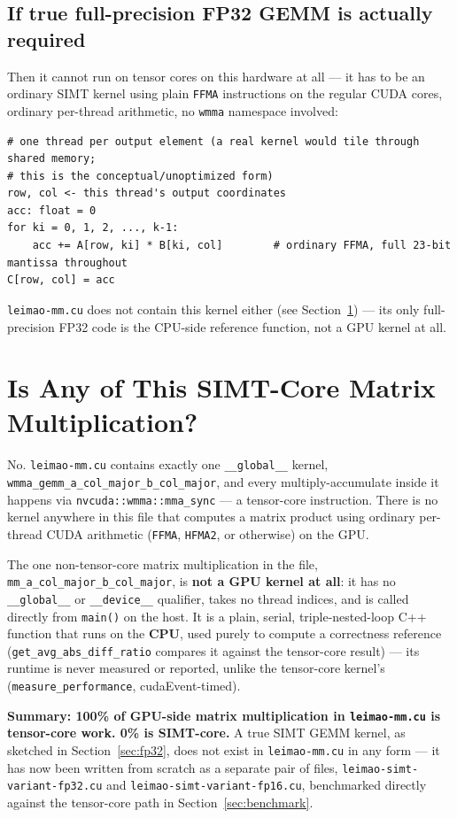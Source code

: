 \documentclass[11pt]{article}
\begin{document}
\subsection{If true full-precision FP32 GEMM is actually required}
Then it cannot run on tensor cores on this hardware at all --- it has to be an ordinary
SIMT kernel using plain \texttt{FFMA} instructions on the regular CUDA cores, ordinary
per-thread arithmetic, no \texttt{wmma} namespace involved:
\begin{lstlisting}
# one thread per output element (a real kernel would tile through shared memory;
# this is the conceptual/unoptimized form)
row, col <- this thread's output coordinates
acc: float = 0
for ki = 0, 1, 2, ..., k-1:
    acc += A[row, ki] * B[ki, col]        # ordinary FFMA, full 23-bit mantissa throughout
C[row, col] = acc
\end{lstlisting}
\texttt{leimao-mm.cu} does not contain this kernel either (see Section~\ref{sec:simt}) ---
its only full-precision FP32 code is the CPU-side reference function, not a GPU kernel at
all.

\section{Is Any of This SIMT-Core Matrix Multiplication?}
\label{sec:simt}

No. \texttt{leimao-mm.cu} contains exactly one \texttt{\_\_global\_\_} kernel,
\texttt{wmma\_gemm\_a\_col\_major\_b\_col\_major}, and every multiply-accumulate inside
it happens via \texttt{nvcuda::wmma::mma\_sync} --- a tensor-core instruction. There is no
kernel anywhere in this file that computes a matrix product using ordinary per-thread CUDA
arithmetic (\texttt{FFMA}, \texttt{HFMA2}, or otherwise) on the GPU.

The one non-tensor-core matrix multiplication in the file,
\texttt{mm\_a\_col\_major\_b\_col\_major}, is \textbf{not a GPU kernel at all}: it has no
\texttt{\_\_global\_\_} or \texttt{\_\_device\_\_} qualifier, takes no thread indices, and
is called directly from \texttt{main()} on the host. It is a plain, serial,
triple-nested-loop C++ function that runs on the \textbf{CPU}, used purely to compute a
correctness reference (\texttt{get\_avg\_abs\_diff\_ratio} compares it against the
tensor-core result) --- its runtime is never measured or reported, unlike the tensor-core
kernel's (\texttt{measure\_performance}, cudaEvent-timed).

\textbf{Summary: 100\% of GPU-side matrix multiplication in \texttt{leimao-mm.cu} is
tensor-core work. 0\% is SIMT-core.} A true SIMT GEMM kernel, as sketched in
Section~\ref{sec:fp32}, does not exist in \texttt{leimao-mm.cu} in any form --- it has
now been written from scratch as a separate pair of files,
\texttt{leimao-simt-variant-fp32.cu} and \texttt{leimao-simt-variant-fp16.cu}, benchmarked
directly against the tensor-core path in Section~\ref{sec:benchmark}.
\end{document}
